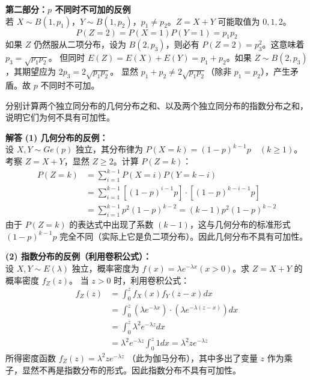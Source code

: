 \textbf{第二部分：$p$ 不同时不可加的反例} \\
若 $X \sim B(1, p_1)$，$Y \sim B(1, p_2)$，$p_1 \neq p_2$。$Z = X+Y$ 可能取值为 $0, 1, 2$。
$$ P(Z=2) = P(X=1)P(Y=1) = p_1 p_2 $$
如果 $Z$ 仍然服从二项分布，设为 $B(2, p_3)$，则必有 $P(Z=2) = p_3^2$。这意味着 $p_3 = \sqrt{p_1 p_2}$。
但同时 $E(Z) = E(X)+E(Y) = p_1+p_2$。如果 $Z \sim B(2, p_3)$，其期望应为 $2p_3 = 2\sqrt{p_1 p_2}$。
显然 $p_1+p_2 \neq 2\sqrt{p_1 p_2}$（除非 $p_1=p_2$），产生矛盾。故 $p$ 不同时不可加。


\vspace{1em}
\begin{例题}[几何分布与指数分布不可加的反例]
	分别计算两个独立同分布的几何分布之和、以及两个独立同分布的指数分布之和，说明它们为何不具有可加性。
\end{例题}
\textbf{解答}\quad
\textbf{(1) 几何分布的反例：} \\
设 $X, Y \sim Ge(p)$ 独立，其分布律为 $P(X=k) = (1-p)^{k-1}p \quad (k \ge 1)$。
考察 $Z = X + Y$，显然 $Z \ge 2$。计算 $P(Z=k)$：
$$ 
\begin{aligned}
P(Z=k) &= \sum_{i=1}^{k-1} P(X=i)P(Y=k-i) \\
&= \sum_{i=1}^{k-1} [(1-p)^{i-1}p] \cdot [(1-p)^{k-i-1}p] \\
&= \sum_{i=1}^{k-1} p^2 (1-p)^{k-2} = (k-1)p^2(1-p)^{k-2}
\end{aligned}
$$
由于 $P(Z=k)$ 的表达式中出现了系数 $(k-1)$，这与几何分布的标准形式 $(1-p)^{k-1}p$ 完全不同（实际上它是负二项分布）。因此几何分布不具有可加性。

\textbf{(2) 指数分布的反例（利用卷积公式）：} \\
设 $X, Y \sim E(\lambda)$ 独立，概率密度为 $f(x) = \lambda e^{-\lambda x} (x>0)$。求 $Z=X+Y$ 的概率密度 $f_Z(z)$。
当 $z > 0$ 时，利用卷积公式：
$$ 
\begin{aligned}
f_Z(z) &= \int_{0}^{z} f_X(x) f_Y(z-x) dx \\
&= \int_{0}^{z} (\lambda e^{-\lambda x}) \cdot (\lambda e^{-\lambda (z-x)}) dx \\
&= \int_{0}^{z} \lambda^2 e^{-\lambda z} dx \\
&= \lambda^2 e^{-\lambda z} \int_{0}^{z} 1 dx = \lambda^2 z e^{-\lambda z}
\end{aligned}
$$
所得密度函数 $f_Z(z) = \lambda^2 z e^{-\lambda z}$ （此为伽马分布），其中多出了变量 $z$ 作为乘子，显然不再是指数分布的形式。因此指数分布不具有可加性。